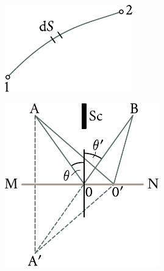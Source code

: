 \begin{figure}[!htb]
	\begin{minipage}[t]{0.48\linewidth}
		\begin{center}
			\includegraphics[scale=1]{figures/ch_16/fig_16_6.pdf}
			\caption[]{}
			\label{fig:16_6}
		\end{center}
	\end{minipage}
	\hfill{ }%
	\begin{minipage}[t]{0.48\linewidth}
		\begin{center}
			\includegraphics[scale=1]{figures/ch_16/fig_16_7.pdf}
            \caption[]{}
			\label{fig:16_7}
		\end{center}
	\end{minipage}
\vspace{-0.4cm}
\end{figure}

